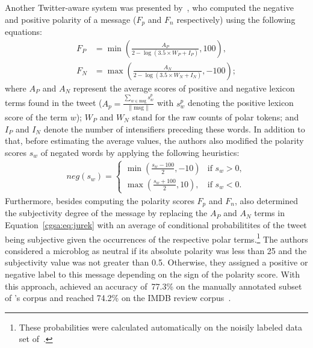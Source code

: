 Another Twitter-aware system was presented by~\citet{Jurek:15}, who
computed the negative and positive polarity of a message ($F_p$ and
$F_n$ respectively) using the following equations: { \small%
  \begin{align}
    F_P &= \min\left(\frac{A_P}{2 - \log(3.5\times W_P + I_P)}, 100\right),\\
    F_N &= \max\left(\frac{A_N}{2 - \log(3.5\times W_N + I_N)}, -100\right);\label{cgsa:eq:jurek}
  \end{align}%
  \normalsize%
}%
where $A_P$ and $A_N$ represent the average scores of positive and
negative lexicon terms found in the tweet
($A_p = \frac{\sum_{w\in\textrm{msg}}s^p_w}{\lVert\textrm{msg}\rVert}$
with $s^p_w$ denoting the positive lexicon score of the term $w$);
$W_P$ and $W_N$ stand for the raw counts of polar tokens; and $I_P$
and $I_N$ denote the number of intensifiers preceding these words.  In
addition to that, before estimating the average values, the authors
also modified the polarity scores $s_w$ of negated words by applying
the following heuristics: { \small%
  \begin{align}
neg(s_w) =
    \begin{cases}
        \min\left(\frac{s_w - 100}{2}, -10\right) & \text{if } s_w > 0,\\
        \max\left(\frac{s_w + 100}{2}, 10\right), & \text{if } s_w < 0.
    \end{cases}
\end{align}%
\normalsize%
}%
Furthermore, besides computing the polarity scores $F_p$ and $F_n$,
\citeauthor{Jurek:15} also determined the subjectivity degree of the
message by replacing the $A_P$ and $A_N$ terms in
Equation~\ref{cgsa:eq:jurek} with an average of conditional
probabilitites of the tweet being subjective given the occurrences of
the respective polar terms.\footnote{These probabilities were
  calculated automatically on the noisily labeled data set
  of~\citet{Go:09}.}  The authors considered a microblog as neutral if
its absolute polarity was less than 25 and the subjectivity value was
not greater than 0.5.  Otherwise, they assigned a positive or negative
label to this message depending on the sign of the polarity score.
With this approach, \citeauthor{Jurek:15} achieved an accuracy
of~77.3\% on the manually annotated subset of \citeauthor{Go:09}'s
corpus and reached 74.2\% on the IMDB review corpus~\cite{Maas:11}.

